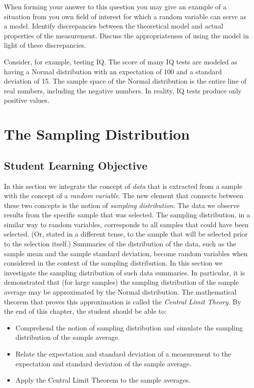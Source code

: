 \documentclass[]{krantz}
\theoremstyle{definition}
\theoremstyle{definition}
\theoremstyle{definition}
\theoremstyle{remark}
\begin{document}
When forming your answer to this question you may give an example of a
situation from you own field of interest for which a random variable can
serve as a model. Identify discrepancies between the theoretical model
and actual properties of the measurement. Discuss the appropriateness of
using the model in light of these discrepancies.

Consider, for example, testing IQ. The score of many IQ tests are
modeled as having a Normal distribution with an expectation of 100 and a
standard deviation of 15. The sample space of the Normal distribution is
the entire line of real numbers, including the negative numbers. In
reality, IQ tests produce only positive values.

\hypertarget{ChapSampDist}{%
\chapter{The Sampling Distribution}\label{ChapSampDist}}

\hypertarget{student-learning-objective-3}{%
\section{Student Learning Objective}\label{student-learning-objective-3}}

In this section we integrate the concept of \emph{data} that is extracted
from a sample with the concept of a \emph{random variable}. The new element
that connects between these two concepts is the notion of \emph{sampling
distribution}. The data we observe results from the specific sample that
was selected. The sampling distribution, in a similar way to random
variables, corresponds to all samples that could have been selected.
(Or, stated in a different tense, to the sample that will be selected
prior to the selection itself.) Summaries of the distribution of the
data, such as the sample mean and the sample standard deviation, become
random variables when considered in the context of the sampling
distribution. In this section we investigate the sampling distribution
of such data summaries. In particular, it is demonstrated that (for
large samples) the sampling distribution of the sample average may be
approximated by the Normal distribution. The mathematical theorem that
proves this approximation is called the \emph{Central Limit Theory}. By the
end of this chapter, the student should be able to:

\begin{itemize}
\item
  Comprehend the notion of sampling distribution and simulate the
  sampling distribution of the sample average.
\item
  Relate the expectation and standard deviation of a measurement to
  the expectation and standard deviation of the sample average.
\item
  Apply the Central Limit Theorem to the sample averages.
\end{itemize}
\end{document}
